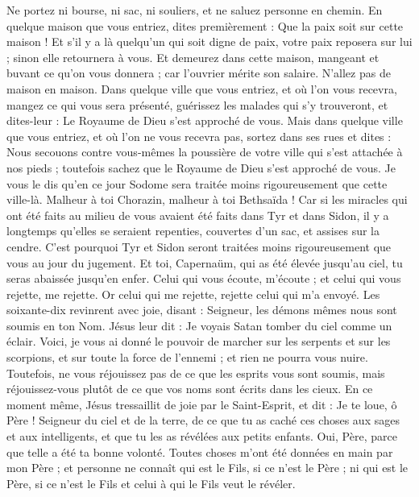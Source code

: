 \begin{multicols}{2}
Ne portez ni bourse, ni sac, ni souliers, et ne saluez personne en chemin.
En quelque maison que vous entriez, dites premièrement : Que la paix soit sur cette maison !
Et s'il y a là quelqu'un qui soit digne de paix, votre paix reposera sur lui ; sinon elle retournera à vous.
Et demeurez dans cette maison, mangeant et buvant ce qu’on vous donnera ; car l'ouvrier mérite son salaire. N’allez pas de maison en maison.
Dans quelque ville que vous entriez, et où l’on vous recevra, mangez ce qui vous sera présenté,
guérissez les malades qui s’y trouveront, et dites-leur : Le Royaume de Dieu s’est approché de vous.
Mais dans quelque ville que vous entriez, et où l’on ne vous recevra pas, sortez dans ses rues et dites :
Nous secouons contre vous-mêmes la poussière de votre ville qui s'est attachée à nos pieds ; toutefois sachez que le Royaume de Dieu s’est approché de vous.
Je vous le dis qu'en ce jour Sodome sera traitée moins rigoureusement que cette ville-là.
Malheur à toi Chorazin, malheur à toi Bethsaïda ! Car si les miracles qui ont été faits au milieu de vous avaient été faits dans Tyr et dans Sidon, il y a longtemps qu'elles se seraient repenties, couvertes d'un sac, et assises sur la cendre.
C'est pourquoi Tyr et Sidon seront traitées moins rigoureusement que vous au jour du jugement.
Et toi, Capernaüm, qui as été élevée jusqu'au ciel, tu seras abaissée jusqu’en enfer.
Celui qui vous écoute, m'écoute ; et celui qui vous rejette, me rejette. Or celui qui me rejette, rejette celui qui m’a envoyé.
Les soixante-dix revinrent avec joie, disant : Seigneur, les démons mêmes nous sont soumis en ton Nom.
Jésus leur dit : Je voyais Satan tomber du ciel comme un éclair.
Voici, je vous ai donné le pouvoir de marcher sur les serpents et sur les scorpions, et sur toute la force de l'ennemi ; et rien ne pourra vous nuire.
Toutefois, ne vous réjouissez pas de ce que les esprits vous sont soumis, mais réjouissez-vous plutôt de ce que vos noms sont écrits dans les cieux.
En ce moment même, Jésus tressaillit de joie par le Saint-Esprit, et dit : Je te loue, ô Père ! Seigneur du ciel et de la terre, de ce que tu as caché ces choses aux sages et aux intelligents, et que tu les as révélées aux petits enfants. Oui, Père, parce que telle a été ta bonne volonté.
Toutes choses m'ont été données en main par mon Père ; et personne ne connaît qui est le Fils, si ce n’est le Père ; ni qui est le Père, si ce n’est le Fils et celui à qui le Fils veut le révéler.

\end{multicols}

